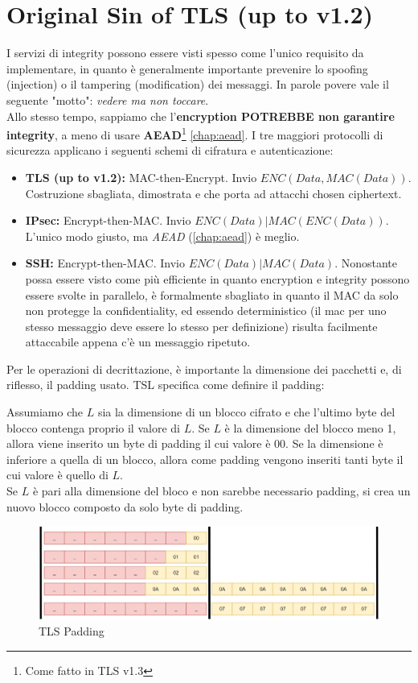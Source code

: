 \section{Original Sin of TLS (up to v1.2)}
I servizi di integrity possono essere visti spesso come l'unico requisito da implementare, in quanto è generalmente importante prevenire lo spoofing (injection) o il tampering (modification) dei messaggi. In parole povere vale il seguente "motto": \textit{vedere ma non toccare}.\\
Allo stesso tempo, sappiamo che l'\textbf{encryption POTREBBE non garantire integrity}, a meno di usare \textbf{AEAD}\footnote{Come fatto in TLS v1.3} \cref{chap:aead}. I tre maggiori protocolli di sicurezza applicano i seguenti schemi di cifratura e autenticazione:
\begin{itemize}
    \item \textbf{TLS (up to v1.2):} MAC-then-Encrypt. Invio $ENC(Data, MAC(Data))$. Costruzione sbagliata, dimostrata e che porta ad attacchi chosen ciphertext. 
    \item \textbf{IPsec:} Encrypt-then-MAC. Invio $ENC(Data)|MAC(ENC(Data))$. L'unico modo giusto, ma \textit{AEAD} (\cref{chap:aead}) è meglio.
    \item \textbf{SSH:} Encrypt-then-MAC. Invio $ENC(Data)|MAC(Data)$. Nonostante possa essere visto come più efficiente in quanto encryption e integrity possono essere svolte in parallelo, è formalmente sbagliato in quanto il MAC da solo non protegge la confidentiality, ed essendo deterministico (il mac per uno stesso messaggio deve essere lo stesso per definizione) risulta facilmente attaccabile appena c'è un messaggio ripetuto.
\end{itemize}
\begin{note}
Per le operazioni di decrittazione, è importante la dimensione dei pacchetti e, di riflesso, il padding usato. TSL specifica come definire il padding:
\end{note}
\begin{definition}
Assumiamo che $L$ sia la dimensione di un blocco cifrato e che l'ultimo byte del blocco contenga proprio il valore di $L$. Se $L$ è la dimensione del blocco meno 1, allora viene inserito un byte di padding il cui valore è $00$. Se la dimensione è inferiore a quella di un blocco, allora come padding vengono inseriti tanti byte il cui valore è quello di $L$.\\
Se $L$ è pari alla dimensione del bloco e non sarebbe necessario padding, si crea un nuovo blocco composto da solo byte di padding.
\end{definition}
\begin{figure}[h]
    \centering
    \includegraphics{image/tlspadding.png}
    \caption{TLS Padding}
    \label{fig:tlspadding}
\end{figure}
